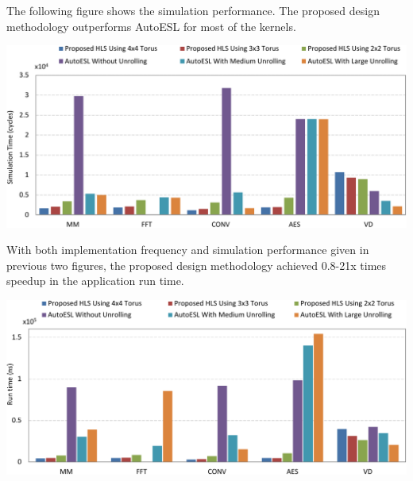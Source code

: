 \documentclass[a0paper,portrait]{baposter}
\begin{document}
\begin{poster}
{The following figure shows the simulation performance. The proposed design methodology outperforms
AutoESL for most of the kernels. 

\begin{center}
\includegraphics[width=0.92\linewidth]{sim_perf}
\end{center}

With both implementation frequency and simulation performance given in previous two figures, 
the proposed design methodology achieved 0.8-21x times speedup in the application run time.

\begin{center}
\includegraphics[width=0.92\linewidth]{real_perf}
\end{center}

}

\end{poster}
\end{document}
